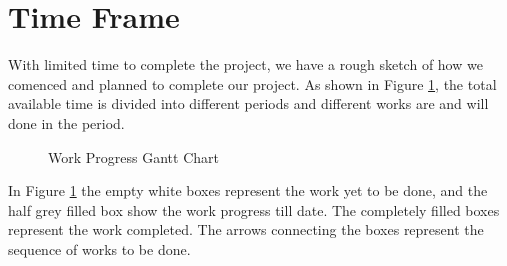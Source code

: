 \section{Time Frame}
	With limited time to complete the project, we have a rough sketch of how we comenced and planned to complete our project. As shown in Figure \ref{fig:GanttChart}, the total available time is divided into different periods and different works are and will done in the period. 


	\begin{figure}[htbp]
		\centering
		
		\caption{Work Progress Gantt Chart }
		\label{fig:GanttChart}	
	\end{figure}

	In Figure \ref{fig:GanttChart} the empty white boxes represent the work yet to be done, and the half grey filled box show the work progress till date. The completely filled boxes represent the work completed. The arrows connecting the boxes represent the sequence of works to be done.
\newpage

